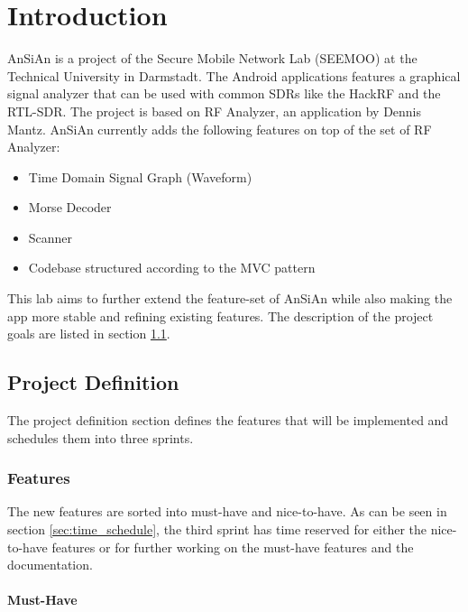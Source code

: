 \chapter{Introduction}\label{ch:introduction}
\glsresetall %

\ac{AnSiAn} is a project of the Secure Mobile Network Lab (SEEMOO) at the
Technical University in Darmstadt. The Android applications features a
graphical signal analyzer that can be used with common \acp{SDR} like the
HackRF and the RTL-SDR. The project is based on RF Analyzer, an application by
Dennis Mantz. AnSiAn currently adds the following features on top of the set of
RF Analyzer:
\begin{itemize}
	\item Time Domain Signal Graph (Waveform)
	\item Morse Decoder
	\item Scanner
	\item Codebase structured according to the MVC pattern
\end{itemize}

This lab aims to further extend the feature-set of \ac{AnSiAn} while also
making the app more stable and refining existing features. The description of
the project goals are listed in section \ref{sec:project_definition}.


\section{Project Definition}
\label{sec:project_definition}

The project definition section defines the features that will be implemented
and schedules them into three sprints.

\subsection{Features}

The new features are sorted into must-have and nice-to-have. As can be seen in
section \ref{sec:time_schedule}, the third sprint has time reserved for either
the nice-to-have features or for further working on the must-have features and
the documentation.

\subsubsection{Must-Have}

